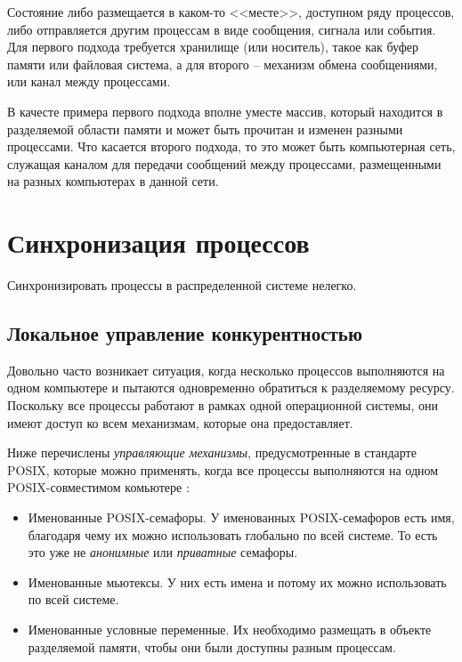 \documentclass[%
	11pt,
	a4paper,
	utf8,
		]{article}
\begin{document}
Состояние либо размещается в каком-то <<месте>>, доступном ряду процессов, либо отправляется другим процессам в виде сообщения, сигнала или события. Для первого подхода требуется хранилище (или носитель), такое как буфер памяти или файловая система, а для второго -- механизм обмена сообщениями, или канал между процессами.

В качесте примера первого подхода вполне уместе массив, который находится в разделяемой области памяти и может быть прочитан и изменен разными процессами. Что касается второго подхода, то это может быть компьютерная сеть, служащая каналом для передачи сообщений между процессами, размещенными на разных компьютерах в данной сети.

\section{Синхронизация процессов}

Синхронизировать процессы в распределенной системе нелегко. 

\subsection{Локальное управление конкурентностью}

Довольно часто возникает ситуация, когда несколько процессов выполняются на одном компьютере и пытаются одновременно обратиться к разделяемому ресурсу. Поскольку все процессы работают в рамках одной операционной системы, они имеют доступ ко всем механизмам, которые она предоставляет.

Ниже перечислены \emph{управляющие механизмы}, предусмотренные в стандарте POSIX, которые можно применять, когда все процессы выполняются на одном POSIX-совместимом комьютере \cite[]{amini-extreme-c:2022}:
\begin{itemize}
	\item Именованные POSIX-семафоры. У именованных POSIX-семафоров есть имя, благодаря чему их можно использовать глобально по всей системе. То есть это уже не \emph{анонимные} или \emph{приватные} семафоры.
	
	\item Именованные мьютексы. У них есть имена и потому их можно использовать по всей системе.
	
	\item Именованные условные переменные. Их необходимо размещать в объекте разделяемой памяти, чтобы они были доступны разным процессам.
\end{itemize}
\end{document}
